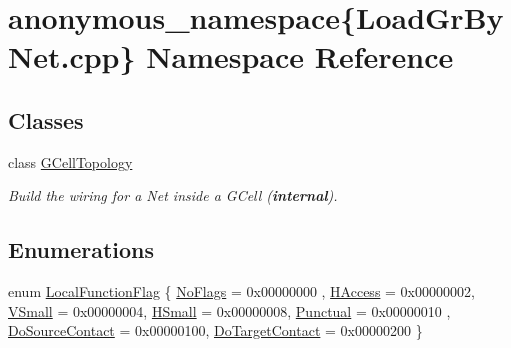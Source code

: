 \hypertarget{namespaceanonymous__namespace_02LoadGrByNet_8cpp_03}{}\section{anonymous\+\_\+namespace\{Load\+Gr\+By\+Net.\+cpp\} Namespace Reference}
\label{namespaceanonymous__namespace_02LoadGrByNet_8cpp_03}
\subsection*{Classes}
\begin{DoxyCompactItemize}
\item 
class \mbox{\hyperlink{classanonymous__namespace_02LoadGrByNet_8cpp_03_1_1GCellTopology}{G\+Cell\+Topology}}
\begin{DoxyCompactList}\small\item\em Build the wiring for a Net inside a G\+Cell ({\bfseries internal}). \end{DoxyCompactList}\end{DoxyCompactItemize}
\subsection*{Enumerations}
\begin{DoxyCompactItemize}
\item 
enum \mbox{\hyperlink{group__LoadGlobalRouting_gaec07c7f30c801c3b0f72193757250d64}{Local\+Function\+Flag}} \{ \newline
\mbox{\hyperlink{group__LoadGlobalRouting_ggaec07c7f30c801c3b0f72193757250d64add44bf8d6f7bbe1393d76b940b85294b}{No\+Flags}} = 0x00000000
, \newline
\mbox{\hyperlink{group__LoadGlobalRouting_ggaec07c7f30c801c3b0f72193757250d64a5c3692a6c886c6293a3c9f240b60a5d9}{H\+Access}} = 0x00000002, 
\newline
\mbox{\hyperlink{group__LoadGlobalRouting_ggaec07c7f30c801c3b0f72193757250d64a260f6bf57246879aed7febfe83c9dacc}{V\+Small}} = 0x00000004, 
\newline
\mbox{\hyperlink{group__LoadGlobalRouting_ggaec07c7f30c801c3b0f72193757250d64af1a4f1cb841460f20d26dcf902247fb8}{H\+Small}} = 0x00000008, 
\newline
\mbox{\hyperlink{group__LoadGlobalRouting_ggaec07c7f30c801c3b0f72193757250d64a65b52a199afe857e3d551dbac8b293b9}{Punctual}} = 0x00000010
, \newline
\mbox{\hyperlink{group__LoadGlobalRouting_ggaec07c7f30c801c3b0f72193757250d64aece46caaf822b33d7db94bb2dd16a30d}{Do\+Source\+Contact}} = 0x00000100, 
\newline
\mbox{\hyperlink{group__LoadGlobalRouting_ggaec07c7f30c801c3b0f72193757250d64aeb33c01c5e62df73de6b11888b17a5f2}{Do\+Target\+Contact}} = 0x00000200
 \}
\end{DoxyCompactItemize}

